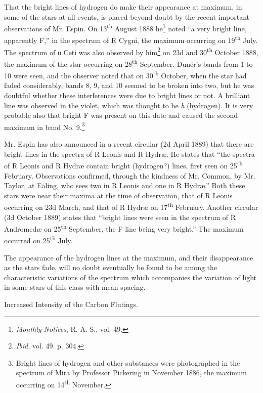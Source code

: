 \documentclass[a4paper, 12pt, oneside, polutonikogreek, english]{article}
\begin{document}
That the bright lines of hydrogen do make their appearance at maximum, in some of the stars at all events, is placed beyond doubt by the recent important observations of Mr. Espin. On 13\textsuperscript{th} August 1888 he\footnote{\emph{Monthly Notices}, R. A. S., vol. 49.} noted ``a very bright line, apparently F,'' in the spectrum of R Cygni, the maximum occurring on 19\textsuperscript{th} July. The spectrum of ο Ceti was also observed by him\footnote{\emph{Ibid.} vol. 49. p. 304.} on 23d and 30\textsuperscript{th} October 1888, the maximum of the star occurring on 28\textsuperscript{th} September. Dunér's bands from 1 to 10 were seen, and the observer noted that on 30\textsuperscript{th} October, when the star had faded considerably, bands 8, 9, and 10 seemed to be broken into two, but he was doubtful whether these interferences were due to bright lines or not. A brilliant line was observed in the violet, which was thought to be \emph{h} (hydrogen). It is very probable also that bright F was present on this date and caused the second maximum in band No. 9.\footnote{Bright lines of hydrogen and other substances were photographed in the spectrum of Mira by Professor Pickering in November 1886, the maximum occurring on 14\textsuperscript{th} November.}

Mr. Espin has also announced in a recent circular (2d April 1889) that there are bright lines in the spectra of R Leonis and R Hydræ. He states that ``the spectra of R Leonis and R Hydræ contain bright (hydrogen?) lines, first seen on 25\textsuperscript{th} February. Observations confirmed, through the kindness of Mr. Common, by Mr. Taylor, at Ealing, who sees two in R Leonis and one in R Hydræ.'' Both these stars were near their maxima at the time of observation, that of R Leonis occurring on 23d March, and that of R Hydræ on 17\textsuperscript{th} February. Another circular (3d October 1889) states that ``bright lines were seen in the spectrum of R Andromedæ on 25\textsuperscript{th} September, the F line being very bright.'' The maximum occurred on 25\textsuperscript{th} July.

The appearance of the hydrogen lines at the maximum, and their disappearance as the stars fade, will no doubt eventually be found to be among the characteristic variations of the spectrum which accompanies the variation of light in some stars of this class with mean spacing.

Increased Intensity of the Carbon Flutings.
\end{document}
